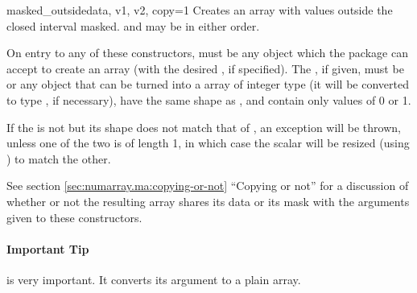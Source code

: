 \begin{methoddesc}[MaskedArray]{masked_outside}{data, v1, v2, copy=1}
   Creates an array with values outside the closed interval \code{[v1, v2]}
   masked.   and  may be in either order.
\end{methoddesc}

On entry to any of these constructors,  must be any object which the
\module{\numarray} package can accept to create an array (with the desired
, if specified). The , if given, must be  or
any object that can be turned into a \module{\numarray} array of integer type
(it will be converted to type , if necessary), have the same
shape as , and contain only values of 0 or 1.

If the  is not  but its shape does not match that of
, an exception will be thrown, unless one of the two is of length 1,
in which case the scalar will be resized (using ) to
match the other.

See section \ref{sec:numarray.ma:copying-or-not} ``Copying or not'' for a
discussion of whether or not the resulting array shares its data or its mask
with the arguments given to these constructors.


\paragraph*{Important Tip}  is very important. It converts its
argument to a plain \module{\numarray} array.

